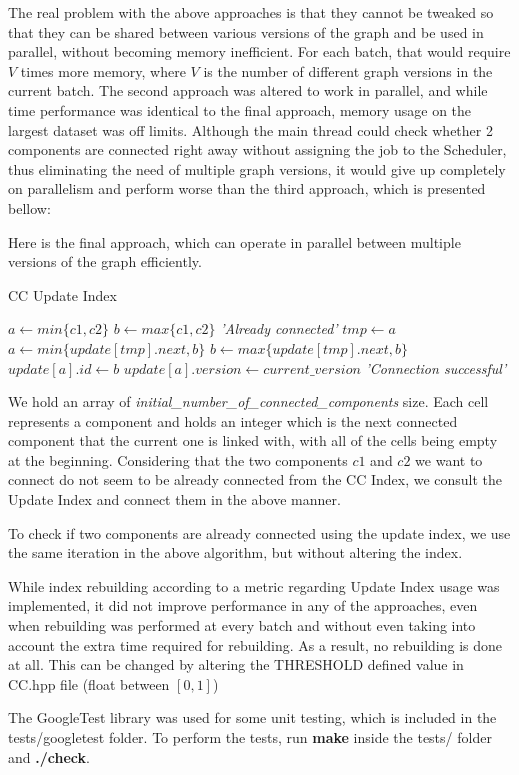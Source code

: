 \documentclass[11pt]{article}
\begin{document}
The real problem with the above approaches is that they cannot be tweaked so that they can be shared between various versions of the graph and be used in parallel,
without becoming memory inefficient. For each batch, that would require $V$ times more memory, where $V$ is the number of different graph versions in the current batch.
The second approach was altered to work in parallel, and while time performance was identical to the final approach, memory usage on the largest dataset was off limits.
Although the main thread could check whether 2 components are connected right away without assigning the job to the Scheduler, thus eliminating the need of multiple graph versions,
it would give up completely on parallelism and perform worse than the third approach, which is presented bellow:

Here is the final approach, which can operate in parallel between multiple versions of the graph efficiently.

\begin{algorithm}
\caption{CC Update Index}\label{euclid}
\begin{algorithmic}[1]
\State $a \gets min\{c1, c2\}$
\State $b \gets max\{c1, c2\}$
		\State \Return \textit{'Already connected'}
	\EndIf
	\State $tmp \gets a$
	\State $a \gets min\{update[tmp].next, b\}$
	\State $b \gets max\{update[tmp].next, b\}$
\EndWhile
\State $update[a].id \gets b$
\State $update[a].version \gets current\_version$
\State \Return \textit{'Connection successful'}
\EndProcedure
\end{algorithmic}
\end{algorithm}

We hold an array of \textit{initial\_number\_of\_connected\_components} size. Each cell represents a component and
holds an integer which is the next connected component that the current one is linked with, with all of the cells being empty at the beginning. 
Considering that the two components $c1$ and $c2$ we want to connect do not seem to be already 
connected from the CC Index, we consult the Update Index and connect them in the above manner.

To check if two components are already connected using the update index, we use the same iteration in the above algorithm, but without altering the index.

While index rebuilding according to a metric regarding Update Index usage was implemented, it did not improve performance in any of the approaches,
even when rebuilding was performed at every batch and without even taking into account the extra time required for rebuilding.
As a result, no rebuilding is done at all. This can be changed by altering the THRESHOLD defined value in CC.hpp file (float between $[0,1]$)

\vspace{5mm}

The GoogleTest library was used for some unit testing, which is included in the tests/googletest folder. To perform the tests, run \textbf{make} inside the tests/ folder and \textbf{./check}.
\end{document}
